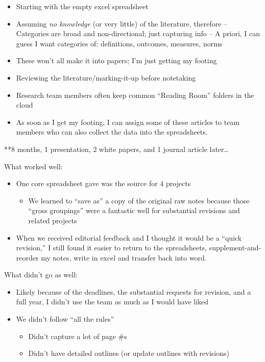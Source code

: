 \documentclass[
  english,
]{book}
\providecommand{\tightlist}{%
  \setlength{\itemsep}{0pt}\setlength{\parskip}{0pt}}
\begin{document}
\begin{itemize}
\tightlist
\item
  Starting with the empty excel spreadsheet
\item
  Assuming \emph{no knowledge} (or very little) of the literature, therefore
  -- Categories are broad and non-directional; just capturing info
  -- A priori, I can guess I want categories of: definitions, outcomes, measures, norms
\item
  These won't all make it into papers; I'm just getting my footing
\item
  Reviewing the literature/marking-it-up before notetaking
\item
  Research team members often keep common ``Reading Room'' folders in the cloud
\item
  As soon as I get my footing, I can assign some of these articles to team members who can also collect the data into the spreadsheets.
\end{itemize}

**8 months, 1 presentation, 2 white papers, and 1 journal article later\ldots{}

What worked well:

\begin{itemize}
\tightlist
\item
  One core spreadsheet gave was the source for 4 projects

  \begin{itemize}
  \tightlist
  \item
    We learned to ``save as'' a copy of the original raw notes because those ``gross groupings'' were a fantastic well for substantial revisions and related projects
  \end{itemize}
\item
  When we received editorial feedback and I thought it would be a ``quick revision,'' I still found it easier to return to the spreadsheets, supplement-and-reorder my notes, write in excel and transfer back into word.
\end{itemize}

What didn't go as well:

\begin{itemize}
\tightlist
\item
  Likely because of the deadlines, the substantial requests for revision, and a full year, I didn't use the team as much as I would have liked
\item
  We didn't follow ``all the rules''

  \begin{itemize}
  \tightlist
  \item
    Didn't capture a lot of page \#s
  \item
    Didn't have detailed outlines (or update outlines with revisions)
  \end{itemize}
\end{itemize}
\end{document}
